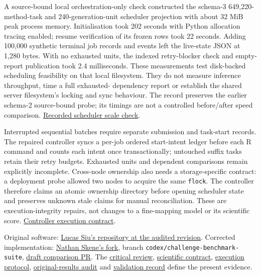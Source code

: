 \documentclass[
  british,
  10pt,
]{article}
\begin{document}
A source-bound local orchestration-only check constructed the schema-3
649,220-method-task and 240-generation-unit scheduler projection with
about 32 MiB peak process memory. Initialisation took 202 seconds with
Python allocation tracing enabled; resume verification of its frozen
rows took 22 seconds. Adding 100,000 synthetic terminal job records and
events left the live-state JSON at 1,280 bytes. With no exhausted units,
the indexed retry-blocker check and empty-report publication took 2.4
milliseconds. These measurements test disk-backed scheduling feasibility
on that local filesystem. They do not measure inference throughput, time
a full exhausted- dependency report or establish the shared server
filesystem's locking and sync behaviour. The record preserves the
earlier schema-2 source-bound probe; its timings are not a controlled
before/after speed comparison.
\href{../docs/validation-artifacts/campaign-hardening-20261010/sqlite-controller-scale.json}{Recorded
scheduler scale check}.

Interrupted sequential batches require separate submission and
task-start records. The repaired controller syncs a per-job ordered
start-intent ledger before each R command and counts each intent once
transactionally; untouched suffix tasks retain their retry budgets.
Exhausted units and dependent comparisons remain explicitly incomplete.
Cross-node ownership also needs a storage-specific contract: a
deployment probe allowed two nodes to acquire the same \texttt{flock}.
The controller therefore claims an atomic ownership directory before
opening scheduler state and preserves unknown stale claims for manual
reconciliation. These are execution-integrity repairs, not changes to a
fine-mapping model or its scientific score.
\href{../scripts/campaign/README.md}{Controller execution contract}.

Original software:
\href{https://github.com/lucassiu14/fine-mapping-benchmark/tree/f053fdf318a3abe2c44eeb0ac3f3c99a03979b81}{Lucas
Siu's repository at the audited revision}. Corrected implementation:
\href{https://github.com/NathanSkene/fine-mapping-benchmark}{Nathan
Skene's fork}, branch \texttt{codex/challenge-benchmark-suite},
\href{https://github.com/NathanSkene/fine-mapping-benchmark/pull/1}{draft
comparison PR}. The \href{../docs/REVIEW.md}{critical review},
\href{../docs/challenge-science.md}{scientific contract},
\href{../docs/challenge-protocol.md}{execution protocol},
\href{../docs/original-results-audit.md}{original-results audit} and
\href{../docs/validation.md}{validation record} define the present
evidence.
\end{document}
